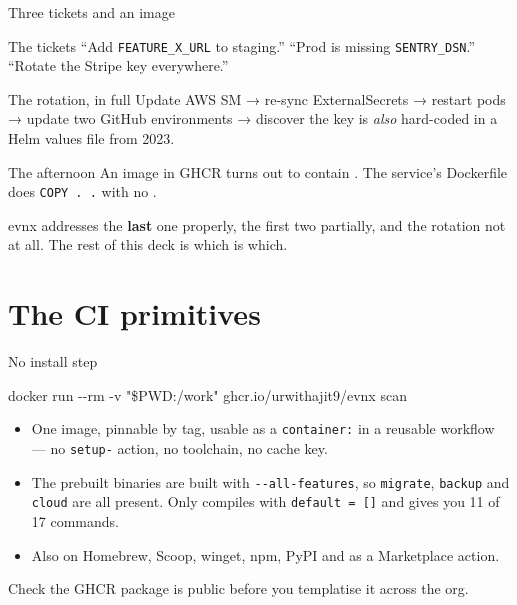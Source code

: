 \documentclass[aspectratio=169,10pt]{beamer}
\begin{document}
\begin{frame}{Three tickets and an image}
  \small
  \begin{block}{The tickets}
    ``Add \texttt{FEATURE\_X\_URL} to staging.'' ``Prod is missing
    \texttt{SENTRY\_DSN}.'' ``Rotate the Stripe key everywhere.''
  \end{block}

  \begin{block}{The rotation, in full}
    Update AWS SM → re-sync ExternalSecrets → restart pods → update two GitHub
    environments → discover the key is \emph{also} hard-coded in a Helm values
    file from 2023.
  \end{block}

  \begin{block}{The afternoon}
    An image in GHCR turns out to contain . The service's Dockerfile
    does \texttt{COPY . .} with no .
  \end{block}

  \vspace{0.4em}
  {\footnotesize evnx addresses the \textbf{last} one properly, the first two
  partially, and the rotation not at all. The rest of this deck is which is which.}
\end{frame}

\section{The CI primitives}

\begin{frame}{No install step}
  \begin{center}\large\ttfamily
  docker run -{}-rm -v "\$PWD:/work" ghcr.io/urwithajit9/evnx scan
  \end{center}

  \vspace{1em}
  \begin{itemize}
    \item One image, pinnable by tag, usable as a \texttt{container:} in a
          reusable workflow --- no \texttt{setup-} action, no toolchain, no
          cache key.
    \item The prebuilt binaries are built with \texttt{-{}-all-features}, so
          \texttt{migrate}, \texttt{backup} and \texttt{cloud} are all present.
          Only  compiles with \texttt{default = []}
          and gives you 11 of 17 commands.
    \item Also on Homebrew, Scoop, winget, npm, PyPI and as a Marketplace
          action.
  \end{itemize}

  \vspace{0.7em}
  {\footnotesize Check the GHCR package is public before you templatise it
  across the org.}
\end{frame}
\end{document}
